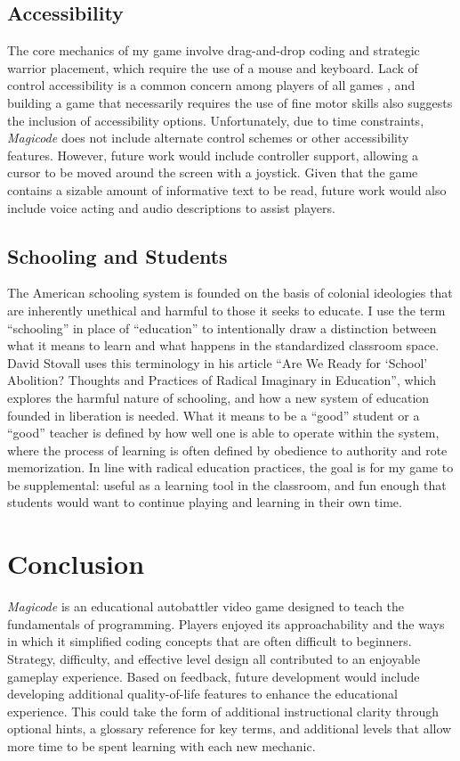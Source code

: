 \documentclass[10pt,twocolumn]{article}
\begin{document}
\subsection{Accessibility}
The core mechanics of my game involve drag-and-drop coding and strategic warrior placement, which require the use of a mouse and keyboard. Lack of control accessibility is a common concern among players of all games \cite{ground-floor-accessibility}, and building a game that necessarily requires the use of fine motor skills also suggests the inclusion of accessibility options. Unfortunately, due to time constraints, \textit{Magicode} does not include alternate control schemes or other accessibility features. However, future work would include controller support, allowing a cursor to be moved around the screen with a joystick. Given that the game contains a sizable amount of informative text to be read, future work would also include voice acting and audio descriptions to assist players.

\subsection{Schooling and Students}
The American schooling system is founded on the basis of colonial ideologies that are inherently unethical and harmful to those it seeks to educate. I use the term “schooling” in place of “education” to intentionally draw a distinction between what it means to learn and what happens in the standardized classroom space. David Stovall \cite{stovall-abolition} uses this terminology in his article “Are We Ready for ‘School’ Abolition? Thoughts and Practices of Radical Imaginary in Education”, which explores the harmful nature of schooling, and how a new system of education founded in liberation is needed. What it means to be a “good” student or a “good” teacher is defined by how well one is able to operate within the system, where the process of learning is often defined by obedience to authority and rote memorization. In line with radical education practices, the goal is for my game to be supplemental: useful as a learning tool in the classroom, and fun enough that students would want to continue playing and learning in their own time.


\section{Conclusion}
\textit{Magicode} is an educational autobattler video game designed to teach the fundamentals of programming. Players enjoyed its approachability and the ways in which it simplified coding concepts that are often difficult to beginners. Strategy, difficulty, and effective level design all contributed to an enjoyable gameplay experience. Based on feedback, future development would include developing additional quality-of-life features to enhance the educational experience. This could take the form of additional instructional clarity through optional hints, a glossary reference for key terms, and additional levels that allow more time to be spent learning with each new mechanic.
\end{document}
